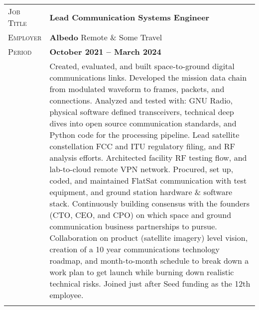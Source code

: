 \documentclass[a4paper, oneside, final]{scrartcl}
\newcommand{\gray}{\rowcolor[gray]{.90}} %
\begin{document}
\begin{center}
\begin{tabularx}{0.97\linewidth}{>{\raggedleft\scshape}p{2cm}X}
\gray Job Title & \textbf{Lead Communication Systems Engineer}\\
\gray Employer & \textbf{Albedo} \hfill Remote \& Some Travel\\
\gray Period & \textbf{October 2021 -- March 2024}\\
&
\vspace{-0.15 cm}
Created, evaluated, and built space-to-ground digital communications links. Developed the mission data chain from modulated waveform to frames, packets, and connections. Analyzed and tested with: GNU Radio, physical software defined transceivers, technical deep dives into open source communication standards, and Python code for the processing pipeline.
\newline
\newline
Lead satellite constellation FCC and ITU regulatory filing, and RF analysis efforts.
\newline
\newline
Architected facility RF testing flow, and lab-to-cloud remote VPN network. Procured, set up, coded, and maintained FlatSat communication with test equipment, and ground station hardware \& software stack.
\newline
\newline
Continuously building consensus with the founders (CTO, CEO, and CPO) on which space and ground communication business partnerships to pursue. Collaboration on product (satellite imagery) level vision, creation of a 10 year communications technology roadmap, and month-to-month schedule to break down a work plan to get launch while burning down realistic technical risks. 
\newline
\newline
Joined just after Seed funding as the 12th employee.
\\
\\
\end{tabularx}


\end{center}
\end{document}
